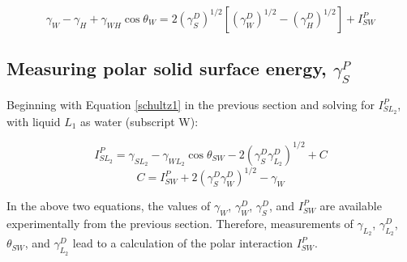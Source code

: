 \begin{equation} 
\label{schultz2}
	\gamma_{W}-\gamma_{H}+\gamma_{WH}\cos\theta_{W} = 2(\gamma_{S}^{D})^{1/2}[(\gamma_{W}^{D})^{1/2}-(\gamma_{H}^{D})^{1/2}] + I_{SW}^{P} 
\end{equation} 

\subsection{Measuring polar solid surface energy, $\gamma_{S}^{P}$}

Beginning with Equation \ref{schultz1} in the previous section and solving for $ I_{SL_{2}}^{P} $, with liquid $L_1$ as water (subscript W):

\begin{equation}
	I_{SL_2}^{P} = \gamma_{SL_2}-\gamma_{WL_2}\cos\theta_{SW}-2(\gamma_{S}^{D}\gamma_{L_2}^{D})^{1/2} + C
\end{equation}
\begin{equation}
	C = I_{SW}^{P} + 2(\gamma_{S}^{D}\gamma_{W}^{D})^{1/2} - \gamma_W
\end{equation}

In the above two equations, the values of $ \gamma_W$, $ \gamma_{W}^{D} $, $ \gamma_{S}^{D} $, and $I_{SW}^{P}$ are available experimentally from the previous section. Therefore, measurements of $ \gamma_{L_2}$, $ \gamma_{L_2}^{D} $, $\theta_{SW}$, and $ \gamma_{L_2}^{D} $ lead to a calculation of the polar interaction $I_{SW}^{P}$. 





